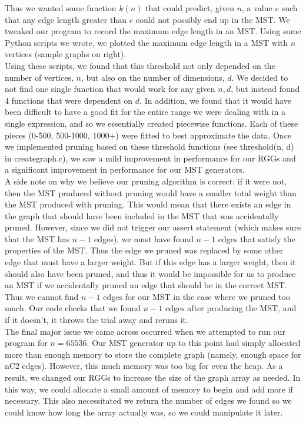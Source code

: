 \documentclass[12pt]{article}
\begin{document}
Thus we wanted some function $k(n)$ that could predict, given $n$, a value $e$ such that any edge length greater than $e$ could not possibly end up in the MST. We tweaked our program to record the maximum edge length in an MST. Using some Python scripts we wrote, we plotted the maximum edge length in a MST with $n$ vertices (sample graphs on right). \\

Using these scripts, we found that this threshold not only depended on the number of vertices, $n$, but also on the number of dimensions, $d$. We decided to not find one single function that would work for any given $n, d$, but instead found 4 functions that were dependent on $d$. In addition, we found that it would have been difficult to have a good fit for the entire range we were dealing with in a single expression, and so we essentially created piecewise functions. Each of these pieces (0-500, 500-1000, 1000+) were fitted to best approximate the data. Once we implemented pruning based on these threshold functions (see threshold(n, d) in creategraph.c), we saw a mild improvement in performance for our RGGs and a significant improvement in performance for our MST generators. \\

A side note on why we believe our pruning algorithm is correct: if it were not, then the MST produced without pruning would have a smaller total weight than the MST produced with pruning. This would mean that there exists an edge in the graph that should have been included in the MST that was accidentally pruned. However, since we did not trigger our assert statement (which makes sure that the MST has $n - 1$ edges), we must have found $n - 1$ edges that satisfy the properties of the MST. Thus the edge we pruned was replaced by some other edge that must have a larger weight. But if this edge has a larger weight, then it should also have been pruned, and thus it would be impossible for us to produce an MST if we accidentally pruned an edge that should be in the correct MST. Thus we cannot find $n - 1$ edges for our MST in the case where we pruned too much. Our code checks that we found $n - 1$ edges after producing the MST, and if it doesn't, it throws the trial away and reruns it.  \\

The final major issue we came across occurred when we attempted to run our program for $n = 65536$. Our MST generator up to this point had simply allocated more than enough memory to store the complete graph (namely, enough space for nC2 edges). However, this much memory was too big for even the heap. As a result, we changed our RGGs to increase the size of the graph array as needed. In this way, we could allocate a small amount of memory to begin and add more if necessary. This also necessitated we return the number of edges we found so we could know how long the array actually was, so we could manipulate it later. \\
\end{document}
